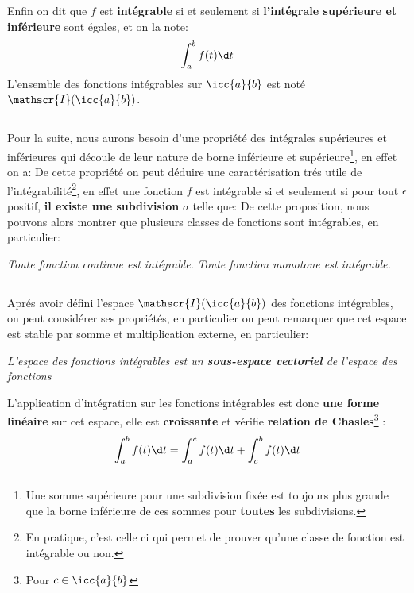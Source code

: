 Enfin on dit que \(f\) est \textbf{intégrable} si et seulement si \textbf{l'intégrale supérieure et inférieure} sont égales, et on la note:
\[
   \int_{a}^{b} f(t) \d t  
\]
L'ensemble des fonctions intégrables sur \(\icc{a}{b}\) est noté \(\mathscr{I}(\icc{a}{b})\).
\pagebreak

\subsection*{}

Pour la suite, nous aurons besoin d'une propriété des intégrales supérieures et inférieures qui découle de leur nature de borne inférieure et supérieure\footnote[1]{Une somme supérieure pour une subdivision fixée est toujours plus grande que la borne inférieure de ces sommes pour \textbf{toutes} les subdivisions.}, en effet on a:
De cette propriété on peut déduire une caractérisation trés utile de l'intégrabilité\footnote[2]{En pratique, c'est celle ci qui permet de prouver qu'une classe de fonction est intégrable ou non.}, en effet une fonction \(f\) est intégrable si et seulement si pour tout \(\epsilon\) positif, \textbf{il existe une subdivision} \(\sigma\) telle que:
De cette proposition, nous pouvons alors montrer que plusieurs classes de fonctions sont intégrables, en particulier:
\begin{center}
   \textit{Toute fonction continue est intégrable.}\+
   \textit{Toute fonction monotone est intégrable. }
\end{center}

\subsection*{}

Aprés avoir défini l'espace \(\mathscr{I}(\icc{a}{b})\) des fonctions intégrables, on peut considérer ses propriétés, en particulier on peut remarquer que cet espace est stable par somme et multiplication externe, en particulier:
\begin{center}
   \textit{L'espace des fonctions intégrables est un \textbf{sous-espace vectoriel} de l'espace des fonctions}
\end{center}
L'application d'intégration sur les fonctions intégrables est donc \textbf{une forme linéaire} sur cet espace, elle est \textbf{croissante} et vérifie \textbf{relation de Chasles}\footnote[3]{Pour \(c \in \icc{a}{b}\)} :
\[
   \int_{a}^{b} f(t) \d t = \int_{a}^{c} f(t) \d t + \int_{c}^{b} f(t) \d t
\]
  

